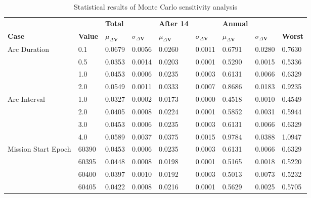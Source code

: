 \begin{table}[H]
\centering
\begin{tabular}{lllllllll}
 &  & \cellcolor[HTML]{EFEFEF}\textbf{Total} &  & \cellcolor[HTML]{EFEFEF}\textbf{After 14} & & \cellcolor[HTML]{EFEFEF}\textbf{Annual} & &\\
\rowcolor[HTML]{EFEFEF} 
\textbf{Case} & \textbf{Value} & \textbf{$\mu_{\Delta \boldsymbol{V}}$} & \textbf{$\sigma_{\Delta \boldsymbol{V}}$} & \textbf{$\mu_{\Delta \boldsymbol{V}}$} & \textbf{$\sigma_{\Delta \boldsymbol{V}}$} & \textbf{$\mu_{\Delta \boldsymbol{V}}$} & \textbf{$\sigma_{\Delta \boldsymbol{V}}$} & \textbf{Worst} \\ 
Arc Duration & 0.1 & 0.0679 & 0.0056 & 0.0260 & 0.0011 & 0.6791 & 0.0280 & 0.7630 \\ 
 & 0.5 & 0.0353 & 0.0014 & 0.0203 & 0.0001 & 0.5290 & 0.0015 & 0.5336 \\ 
 & 1.0 & 0.0453 & 0.0006 & 0.0235 & 0.0003 & 0.6131 & 0.0066 & 0.6329 \\ 
 & 2.0 & 0.0549 & 0.0011 & 0.0333 & 0.0007 & 0.8686 & 0.0183 & 0.9235 \\ 
Arc Interval & 1.0 & 0.0327 & 0.0002 & 0.0173 & 0.0000 & 0.4518 & 0.0010 & 0.4549 \\ 
 & 2.0 & 0.0405 & 0.0008 & 0.0224 & 0.0001 & 0.5852 & 0.0031 & 0.5944 \\ 
 & 3.0 & 0.0453 & 0.0006 & 0.0235 & 0.0003 & 0.6131 & 0.0066 & 0.6329 \\ 
 & 4.0 & 0.0589 & 0.0037 & 0.0375 & 0.0015 & 0.9784 & 0.0388 & 1.0947 \\ 
Mission Start Epoch & 60390 & 0.0453 & 0.0006 & 0.0235 & 0.0003 & 0.6131 & 0.0066 & 0.6329 \\ 
 & 60395 & 0.0448 & 0.0008 & 0.0198 & 0.0001 & 0.5165 & 0.0018 & 0.5220 \\ 
 & 60400 & 0.0397 & 0.0010 & 0.0192 & 0.0003 & 0.5013 & 0.0073 & 0.5232 \\ 
 & 60405 & 0.0422 & 0.0008 & 0.0216 & 0.0001 & 0.5629 & 0.0025 & 0.5705 \\ 
\end{tabular}
\caption{Statistical results of Monte Carlo sensitivity analysis}
\label{tab:SensitivityAnalysis}
\end{table}